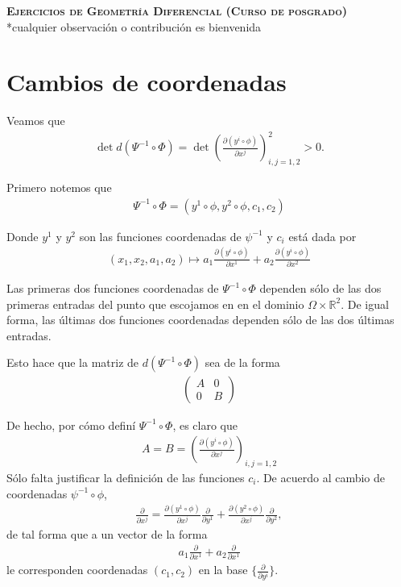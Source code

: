 \documentclass[11pt]{article}
\theoremstyle{definition}
\begin{document}
\setcounter{section}{0}
\title{}

\thispagestyle{empty}

\begin{center}
{\Large \bf \scshape Ejercicios de Geometría Diferencial (Curso de posgrado)}\\
*cualquier observación o contribución es bienvenida
\end{center}
\section*{Cambios de coordenadas}

Veamos que
\begin{align*}
\det d(\Psi^{-1}\circ\Phi)= \det \left(\frac{\partial (y^i\circ \phi)}{\partial x^j}\right)_{i,j=1,2}^2 > 0.
\end{align*}

Primero notemos que 
\begin{align*}
\Psi^{-1}\circ\Phi=(y^1\circ\phi,y^2\circ\phi,c_1,c_2)
\end{align*}
\par Donde $y^1$ y $y^2$ son las funciones coordenadas de $\psi^{-1}$ y $c_i$ está dada por
\begin{align*}
(x_1,x_2,a_1,a_2)\mapsto a_1\frac{\partial (y^i\circ \phi)}{\partial x^1}+a_2\frac{\partial (y^i\circ \phi)}{\partial x^2}
\end{align*}
\par Las primeras dos funciones coordenadas de $\Psi^{-1}\circ\Phi$ dependen sólo de las dos primeras entradas del punto que escojamos en en el dominio $\Omega\times\mathbb{R}^2$. De igual forma, las últimas dos funciones coordenadas dependen sólo de las dos últimas entradas.\par
Esto hace que la matriz de $d(\Psi^{-1}\circ\Phi)$ sea de la forma 
\begin{align*}
\begin{pmatrix}
A & 0 \\
0 & B
\end{pmatrix}
\end{align*}
\par De hecho, por cómo definí $\Psi^{-1}\circ\Phi$, es claro que
\begin{align*}
A=B=\left(\frac{\partial (y^i\circ \phi)}{\partial x^j}\right)_{i,j=1,2}
\end{align*}
Sólo falta justificar la definición de las funciones $c_i$. De acuerdo al cambio de coordenadas $\psi^{-1}\circ\phi$,
\begin{align*}
\frac{\partial}{\partial x^j}=\frac{\partial (y^1\circ \phi)}{\partial x^j}\frac{\partial}{\partial y^1}+\frac{\partial (y^2\circ \phi)}{\partial x^j}\frac{\partial}{\partial y^2},
\end{align*}
de tal forma que a un vector de la forma
\begin{align*}
 a_1\frac{\partial}{\partial x^1}+a_2\frac{\partial}{\partial x^1}
\end{align*}
le corresponden coordenadas $(c_1,c_2)$ en la base $\big\{ \frac{\partial}{\partial y^i}\big\}$.
\newpage
\end{document}

